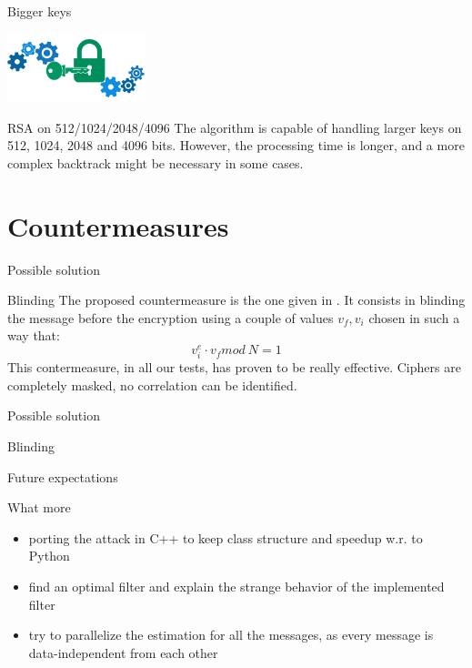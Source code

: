 \documentclass{beamer}
\begin{document}
\begin{frame}{Bigger keys}
  \begin{center}
    \includegraphics[width=4cm]{./graphics/key}
  \end{center}
  \begin{block}{RSA on 512/1024/2048/4096}
		The algorithm is capable of handling larger keys on 512, 1024, 2048 and 4096 bits.
    However, the processing time is longer, and a more complex backtrack might be necessary in some cases.
	\end{block}
\end{frame}



\section{Countermeasures}
\begin{frame}{Possible solution}
    \begin{block}{Blinding}
		The proposed countermeasure is the one given in \cite{kocher1996timing}.
		It consists in blinding the message before the encryption using a couple of values $v_f, v_i$ chosen in such a way that:
		\begin{equation*}
			v_i^e \cdot v_f mod\: N = 1
		\end{equation*}
        This contermeasure, in all our tests, has proven to be really effective. Ciphers are completely masked, no correlation can be identified.
    \end{block}
\end{frame}

\begin{frame}{Possible solution}
    \begin{block}{Blinding}

    \end{block}
\end{frame}

\begin{frame}{Future expectations}
  \begin{block}{What more}
    \begin{itemize}
      \pause \item porting the attack in C++ to keep class structure and speedup w.r. to Python
      \pause \item find an optimal filter and explain the strange behavior of the implemented filter
      \pause \item try to parallelize the estimation for all the messages, as every message is data-independent from each other
    \end{itemize}
  \end{block}
\end{frame}
\end{document}
